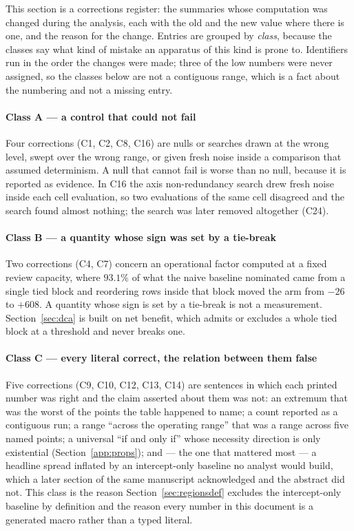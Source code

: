 
This section is a corrections register: the summaries whose computation was
changed during the analysis, each with the old and the new value where there
is one, and the reason for the change. Entries are grouped by \emph{class},
because the classes say what kind of mistake an apparatus of this kind is
prone to. Identifiers run in the order the changes were made; three of the
low numbers were never assigned, so the classes below are not a contiguous
range, which is a fact about the numbering and not a missing entry.

\paragraph{Class A --- a control that could not fail}
Four corrections (C1, C2, C8, C16) are nulls or searches drawn at the wrong
level, swept over the wrong range, or given fresh noise inside a comparison
that assumed determinism. A null that cannot fail is worse than no null,
because it is reported as evidence. In C16 the axis non-redundancy search
drew fresh noise inside each cell evaluation, so two evaluations of the same
cell disagreed and the search found almost nothing; the search was later
removed altogether (C24).

\paragraph{Class B --- a quantity whose sign was set by a tie-break}
Two corrections (C4, C7) concern an operational factor computed at a fixed
review capacity, where $93.1\%$ of what the naive baseline nominated came from
a single tied block and reordering rows inside that block moved the arm from
$-26$ to $+608$. A quantity whose sign is set by a tie-break is not a
measurement. Section~\ref{sec:dca} is built on net benefit, which admits or
excludes a whole tied block at a threshold and never breaks one.

\paragraph{Class C --- every literal correct, the relation between them
false}
Five corrections (C9, C10, C12, C13, C14) are sentences in which each printed
number was right and the claim asserted about them was not: an extremum that
was the worst of the points the table happened to name; a count reported as a
contiguous run; a range ``across the operating range'' that was a range across
five named points; a universal ``if and only if'' whose necessity direction is
only existential (Section~\ref{app:props}); and --- the one that mattered most
--- a headline spread inflated by an intercept-only baseline no analyst would
build, which a later section of the same manuscript acknowledged and the
abstract did not. This class is the reason
Section~\ref{sec:regionsdef} excludes the intercept-only baseline by definition and
the reason every number in this document is a generated macro rather than a
typed literal.

